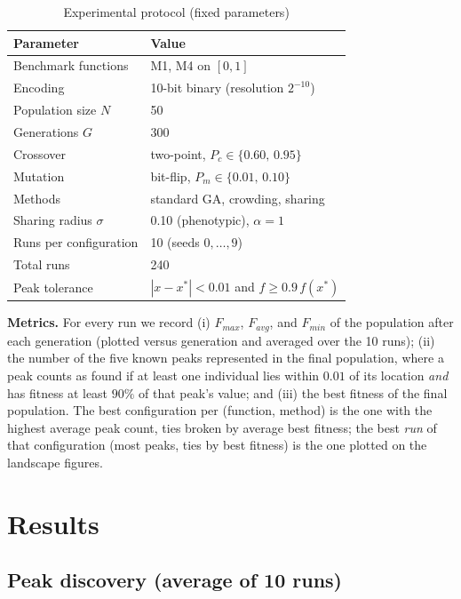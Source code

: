 \documentclass[conference]{IEEEtran}
\begin{document}
\begin{table}[htbp]
\caption{Experimental protocol (fixed parameters)}
\label{tab:protocol}
\centering
\begin{tabular}{@{}ll@{}}
\toprule
Parameter & Value \\
\midrule
Benchmark functions & M1, M4 on $[0,1]$ \\
Encoding & 10-bit binary (resolution $2^{-10}$) \\
Population size $N$ & 50 \\
Generations $G$ & 300 \\
Crossover & two-point, $P_c \in \{0.60,\, 0.95\}$ \\
Mutation & bit-flip, $P_m \in \{0.01,\, 0.10\}$ \\
Methods & standard GA, crowding, sharing \\
Sharing radius $\sigma$ & 0.10 (phenotypic), $\alpha=1$ \\
Runs per configuration & 10 (seeds $0,\ldots,9$) \\
Total runs & 240 \\
Peak tolerance & $|x-x^*| < 0.01$ and $f \ge 0.9\,f(x^*)$ \\
\bottomrule
\end{tabular}
\end{table}

\textbf{Metrics.} For every run we record (i) $F_{max}$, $F_{avg}$, and
$F_{min}$ of the population after each generation (plotted versus generation
and averaged over the 10 runs); (ii) the number of the five known peaks
represented in the final population, where a peak counts as found if at least
one individual lies within $0.01$ of its location \emph{and} has fitness at
least $90\%$ of that peak's value; and (iii) the best fitness of the final
population. The best configuration per (function, method) is the one with the
highest average peak count, ties broken by average best fitness; the best
\emph{run} of that configuration (most peaks, ties by best fitness) is the one
plotted on the landscape figures.

\section{Results}
\label{sec:results}

\subsection{Peak discovery (average of 10 runs)}
\end{document}
